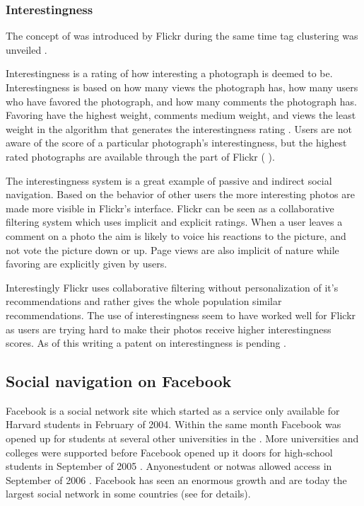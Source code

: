 \subsubsection{Interestingness}
\label{section:analysis.flickr.interestingness}

The concept of  was introduced by Flickr during
the same time tag clustering was unveiled \citep{butterfield05}.

Interestingness is a rating of how interesting a photograph is deemed to be.
Interestingness is based on
how many views the photograph has, how many users who have favored the
photograph, and how many comments the photograph has. Favoring have the
highest weight, comments medium weight, and views the least weight
in the algorithm that generates the interestingness rating \citep{dean08}.
Users are not aware of the score of a particular photograph's interestingness,
but the highest rated photographs are available through the  part of
Flickr
(
).

The interestingness system is a great example of passive and indirect social
navigation. Based on the behavior of other users the more interesting photos
are made more visible in Flickr's interface. Flickr can be seen as a
collaborative filtering system which uses implicit and explicit ratings.
When a user leaves a comment on a photo the aim is likely to voice his
reactions to the picture, and not vote the picture down or up. Page views
are also implicit of nature while favoring are explicitly given by users.

Interestingly Flickr uses
collaborative filtering without personalization of it's recommendations and
rather gives the whole population similar recommendations.
The use of interestingness seem
to have worked well for Flickr as users are trying hard to make their photos
receive higher interestingness scores.
As of this writing a patent on interestingness is pending
\citep{butterfield06b}.

\subsection{Social navigation on Facebook}
\label{section:analysis.facebook}

Facebook is a social network site which started as a service only available
for Harvard students in February of 2004. Within the same month Facebook was
opened up for students at several other universities in the . More
universities and colleges were supported before Facebook opened up it
doors for high-school students in September of 2005 \citep{cassidy06}.
Anyone\dash{}student or not\dash{}was allowed access in
September of 2006 \citep{abram06}.
Facebook has seen an enormous growth and are today the largest social network
in some countries (see
for details).

